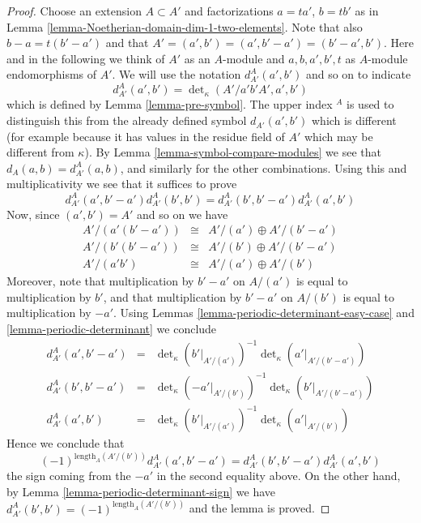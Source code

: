 \begin{proof}
\medskip\noindent
Choose an extension $A \subset A'$ and factorizations
$a = ta'$, $b = tb'$ as in
Lemma \ref{lemma-Noetherian-domain-dim-1-two-elements}.
Note that also $b - a = t(b' - a')$ and that
$A' = (a', b') = (a', b' - a') = (b' - a', b')$.
Here and in the following we think of $A'$ as an $A$-module and
$a, b, a', b', t$ as $A$-module endomorphisms of $A'$.
We will use the notation $d^A_{A'}(a', b')$ and so on to indicate
$$
d^A_{A'}(a', b')
=
\det\nolimits_\kappa(A'/a'b'A', a', b')
$$
which is defined by Lemma \ref{lemma-pre-symbol}. The upper index ${}^A$
is used to distinguish this from the already defined symbol
$d_{A'}(a', b')$ which is different (for example because it has values
in the residue field of $A'$ which may be different from $\kappa$).
By Lemma \ref{lemma-symbol-compare-modules} we see that
$d_A(a, b) = d^A_{A'}(a, b)$,
and similarly for the other combinations.
Using this and multiplicativity we see that it suffices to prove
$$
d^A_{A'}(a', b' - a') d^A_{A'}(b', b')
=
d^A_{A'}(b', b' - a') d^A_{A'}(a', b')
$$
Now, since $(a', b') = A'$ and so on we have
$$
\begin{matrix}
A'/(a'(b' - a')) & \cong & A'/(a') \oplus A'/(b' - a') \\
A'/(b'(b' - a')) & \cong & A'/(b') \oplus A'/(b' - a') \\
A'/(a'b') & \cong & A'/(a') \oplus A'/(b')
\end{matrix}
$$
Moreover, note that multiplication by $b' - a'$ on
$A/(a')$ is equal to multiplication by $b'$, and that
multiplication by $b' - a'$ on $A/(b')$ is equal to multiplication by $-a'$.
Using Lemmas
\ref{lemma-periodic-determinant-easy-case} and
\ref{lemma-periodic-determinant}
we conclude
$$
\begin{matrix}
d^A_{A'}(a', b' - a') & = &
\det\nolimits_\kappa(b'|_{A'/(a')})^{-1}
\det\nolimits_\kappa(a'|_{A'/(b' - a')}) \\
d^A_{A'}(b', b' - a') & = &
\det\nolimits_\kappa(-a'|_{A'/(b')})^{-1}
\det\nolimits_\kappa(b'|_{A'/(b' - a')}) \\
d^A_{A'}(a', b') & = &
\det\nolimits_\kappa(b'|_{A'/(a')})^{-1}
\det\nolimits_\kappa(a'|_{A'/(b')})
\end{matrix}
$$
Hence we conclude that
$$
(-1)^{\text{length}_A(A'/(b'))}
d^A_{A'}(a', b' - a')
=
d^A_{A'}(b', b' - a') d^A_{A'}(a', b')
$$
the sign coming from the $-a'$ in the second equality above.
On the other hand, by Lemma \ref{lemma-periodic-determinant-sign} we have
$d^A_{A'}(b', b') = (-1)^{\text{length}_A(A'/(b'))}$ and the lemma
is proved.
\end{proof}

